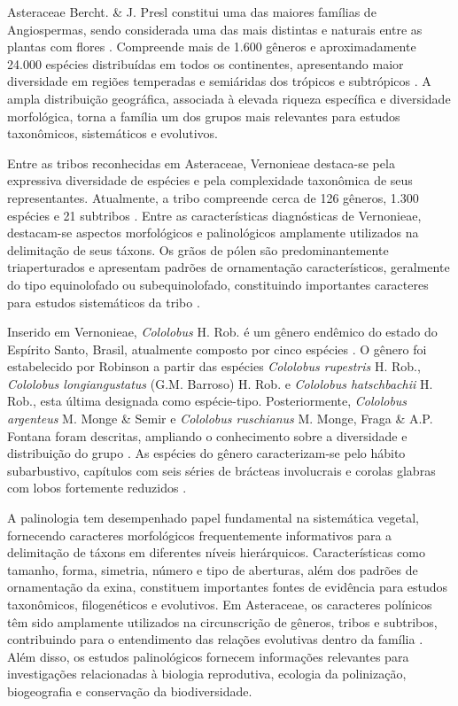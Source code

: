 \documentclass[pdflatex,sn-mathphys-num]{sn-jnl}
\begin{document}
Asteraceae Bercht. \& J. Presl constitui uma das maiores famílias de Angiospermas, sendo considerada uma das mais distintas e naturais entre as plantas com flores \cite{roque2017}. Compreende mais de 1.600 gêneros e aproximadamente 24.000 espécies distribuídas em todos os continentes, apresentando maior diversidade em regiões temperadas e semiáridas dos trópicos e subtrópicos \cite{funk2009}. A ampla distribuição geográfica, associada à elevada riqueza específica e diversidade morfológica, torna a família um dos grupos mais relevantes para estudos taxonômicos, sistemáticos e evolutivos.

Entre as tribos reconhecidas em Asteraceae, Vernonieae destaca-se pela expressiva diversidade de espécies e pela complexidade taxonômica de seus representantes. Atualmente, a tribo compreende cerca de 126 gêneros, 1.300 espécies e 21 subtribos \cite{robinson2007,keeley2009}. Entre as características diagnósticas de Vernonieae, destacam-se aspectos morfológicos e palinológicos amplamente utilizados na delimitação de seus táxons. Os grãos de pólen são predominantemente triaperturados e apresentam padrões de ornamentação característicos, geralmente do tipo equinolofado ou subequinolofado, constituindo importantes caracteres para estudos sistemáticos da tribo \cite{jones1979,esteves2017}.

Inserido em Vernonieae, \textit{Cololobus} H. Rob. é um gênero endêmico do estado do Espírito Santo, Brasil, atualmente composto por cinco espécies \cite{brito2022}. O gênero foi estabelecido por Robinson \cite{robinson1994} a partir das espécies \textit{Cololobus rupestris} H. Rob., \textit{Cololobus longiangustatus} (G.M. Barroso) H. Rob. e \textit{Cololobus hatschbachii} H. Rob., esta última designada como espécie-tipo. Posteriormente, \textit{Cololobus argenteus} M. Monge \& Semir e \textit{Cololobus ruschianus} M. Monge, Fraga \& A.P. Fontana foram descritas, ampliando o conhecimento sobre a diversidade e distribuição do grupo \cite{monge2018,monge2021,brito2022}. As espécies do gênero caracterizam-se pelo hábito subarbustivo, capítulos com seis séries de brácteas involucrais e corolas glabras com lobos fortemente reduzidos \cite{robinson2007}.

A palinologia tem desempenhado papel fundamental na sistemática vegetal, fornecendo caracteres morfológicos frequentemente informativos para a delimitação de táxons em diferentes níveis hierárquicos. Características como tamanho, forma, simetria, número e tipo de aberturas, além dos padrões de ornamentação da exina, constituem importantes fontes de evidência para estudos taxonômicos, filogenéticos e evolutivos. Em Asteraceae, os caracteres polínicos têm sido amplamente utilizados na circunscrição de gêneros, tribos e subtribos, contribuindo para o entendimento das relações evolutivas dentro da família \cite{skvarla1977,jones1979}. Além disso, os estudos palinológicos fornecem informações relevantes para investigações relacionadas à biologia reprodutiva, ecologia da polinização, biogeografia e conservação da biodiversidade.
\end{document}
